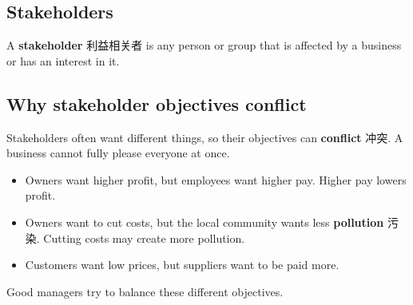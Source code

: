 \documentclass[11pt]{article}
\begin{document}
\subsection*{Stakeholders}

A \textbf{stakeholder} 利益相关者 is any person or group that is affected by a business or has an interest in it.

\begin{center}
\end{center}

\subsection*{Why stakeholder objectives conflict}

Stakeholders often want different things, so their objectives can \textbf{conflict} 冲突. A business cannot fully please everyone at once.

\begin{itemize}
\item Owners want higher profit, but employees want higher pay. Higher pay lowers profit.

\item Owners want to cut costs, but the local community wants less \textbf{pollution} 污染. Cutting costs may create more pollution.

\item Customers want low prices, but suppliers want to be paid more.

\end{itemize}

Good managers try to balance these different objectives.
\end{document}
